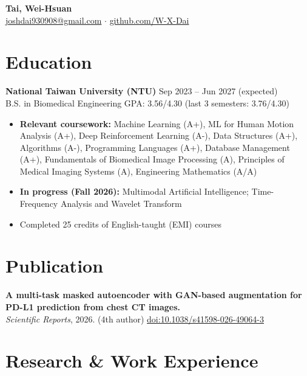 \documentclass[10pt]{article}
\begin{document}
\begin{center}
{\LARGE \textbf{Tai, Wei-Hsuan}} \\[3pt]
\href{mailto:joshdai930908@gmail.com}{joshdai930908@gmail.com} \quad $\cdot$ \quad
\href{https://github.com/W-X-Dai}{github.com/W-X-Dai}
\end{center}

\section*{Education}
\vspace{2pt}\textbf{National Taiwan University (NTU)} \hfill Sep 2023 -- Jun 2027 (expected) \\
B.S. in Biomedical Engineering \hfill GPA: 3.56/4.30 \;(last 3 semesters: 3.76/4.30)
\begin{itemize}
  \item \textbf{Relevant coursework:} Machine Learning (A+), ML for Human Motion Analysis (A+), Deep Reinforcement Learning (A-),
        Data Structures (A+), Algorithms (A-), Programming Languages (A+), Database Management (A+),
        Fundamentals of Biomedical Image Processing (A), Principles of Medical Imaging Systems (A), Engineering Mathematics (A/A)
  \item \textbf{In progress (Fall 2026):} Multimodal Artificial Intelligence; Time-Frequency Analysis and Wavelet Transform
  \item Completed 25 credits of English-taught (EMI) courses
\end{itemize}

\section*{Publication}
\textbf{A multi-task masked autoencoder with GAN-based augmentation for PD-L1 prediction from chest CT images.} \\
\textit{Scientific Reports}, 2026. (4th author) \quad
\href{https://www.nature.com/articles/s41598-026-49064-3}{doi:10.1038/s41598-026-49064-3}

\section*{Research \& Work Experience}
\end{document}

